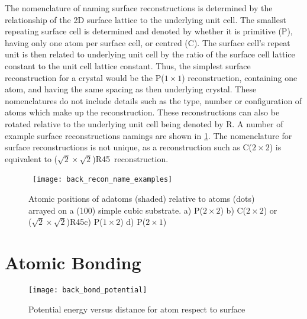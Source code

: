 The nomenclature of naming surface reconstructions is determined by the relationship of the 2D surface lattice to the underlying unit cell. The smallest repeating surface cell is determined and denoted by whether it is primitive (P), having only one atom per surface cell, or centred (C). The surface cell's repeat unit is then related to underlying unit cell by the ratio of the surface cell lattice constant to the unit cell lattice constant. Thus, the simplest surface reconstruction for a crystal would be the P($1 \times 1$) reconstruction, containing one atom, and having the same spacing as then underlying crystal. These nomenclatures do not include details such as the type, number or configuration of atoms which make up the reconstruction. These reconstructions can also be rotated relative to the underlying unit cell being denoted by R. A number of example surface reconstructions namings are shown in \cref{fig:back_recon_name_examples}. The nomenclature for surface reconstructions is not unique, as a reconstruction such as C($2\times2$) is equivalent to ($\sqrt{2}\times\sqrt{2}$)R45\degree~reconstruction.
\begin{figure}
    \centering\
    \texttt{[image: back\_recon\_name\_examples]}
    \caption{\label{fig:back_recon_name_examples} Atomic positions of adatoms (shaded) relative to atoms (dots) arrayed on a (100) simple cubic substrate. a) P($2 \times 2$) b) C($2 \times 2$) or ($\sqrt{2}\times\sqrt{2}$)R45\degree c) P($1 \times 2$) d) P($2 \times 1$)}
\end{figure}

\section{Atomic Bonding}
\begin{figure}
    \centering
    \texttt{[image: back\_bond\_potential]}
    \caption{\label{fig:back_bond_potential}Potential energy versus distance for atom respect to surface}
\end{figure}

